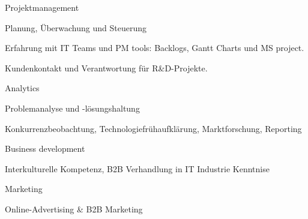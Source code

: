 


\begin{cventries}
	
	\zcventry
	{Projektmanagement} %
	{
		\begin{cvitems} %
			\item {Planung, Überwachung und Steuerung }
			\item {Erfahrung mit IT Teams und PM tools: Backlogs, Gantt Charts und MS project.}
			\item {Kundenkontakt und Verantwortung für R\&D-Projekte.}
		\end{cvitems}
	}
	
	\zcventry
	{Analytics} %
	{
		\begin{cvitems} %
			\item {Problemanalyse und -lösungshaltung}
			\item {Konkurrenzbeobachtung, Technologiefrühaufklärung, Marktforschung, Reporting}
		\end{cvitems}
	}
	
	\zcventry
	{Business development} %
	{
		\begin{cvitems} %
			\item {Interkulturelle Kompetenz, B2B Verhandlung in IT Industrie Kenntnise}
		\end{cvitems}
	}
	
	\zcventry
	{Marketing} %
	{
		\begin{cvitems} %
			\item {Online-Advertising \& B2B Marketing}
		\end{cvitems}
	}
	
\end{cventries}
